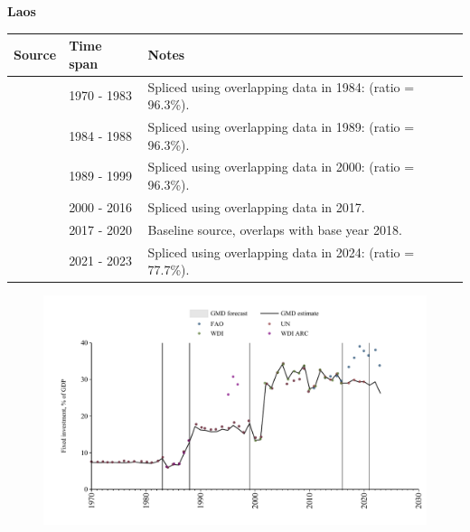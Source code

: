\documentclass[12pt,a4paper,landscape]{article}
\begin{document}
\begin{adjustbox}{max totalsize={\paperwidth}{\paperheight},center}
\begin{minipage}[t][\textheight][t]{\textwidth}
\vspace*{0.5cm}
{}
\begin{center}
{\Large\bfseries Laos}
\end{center}
\vspace{0.5cm}
\begin{table}[H]
\centering
\small
\begin{tabular}{|l|l|l|}
\hline
\textbf{Source} & \textbf{Time span} & \textbf{Notes} \\
\hline
\rowcolor{white}\cite{UN}& 1970 - 1983 &Spliced using overlapping data in 1984: (ratio = 96.3\%).\\
\rowcolor{lightgray}\cite{WDI}& 1984 - 1988 &Spliced using overlapping data in 1989: (ratio = 96.3\%).\\
\rowcolor{white}\cite{UN}& 1989 - 1999 &Spliced using overlapping data in 2000: (ratio = 96.3\%).\\
\rowcolor{lightgray}\cite{WDI}& 2000 - 2016 &Spliced using overlapping data in 2017.\\
\rowcolor{white}\cite{UN}& 2017 - 2020 &Baseline source, overlaps with base year 2018.\\
\rowcolor{lightgray}\cite{FAO}& 2021 - 2023 &Spliced using overlapping data in 2024: (ratio = 77.7\%).\\
\hline
\end{tabular}
\end{table}
\begin{figure}[H]
\centering
\includegraphics[width=\textwidth,height=0.6\textheight,keepaspectratio]{graphs/LAO_finv_GDP.pdf}
\end{figure}
\end{minipage}
\end{adjustbox}
\end{document}
